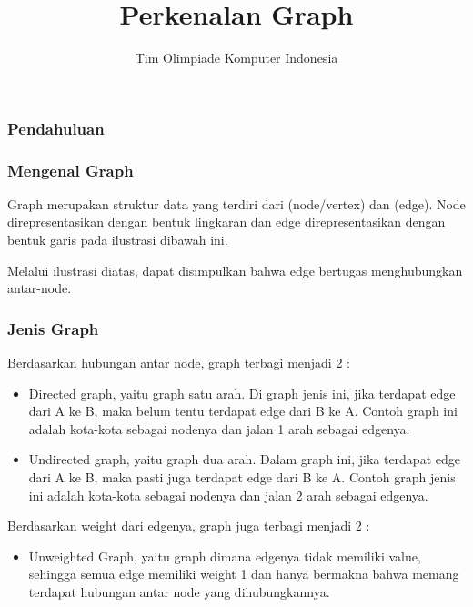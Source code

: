 

\title{Perkenalan Graph}
\author{Tim Olimpiade Komputer Indonesia}
\date{}



\begin{frame}
\titlepage
\end{frame}

\begin{frame}
\frametitle{Pendahuluan}

\end{frame}

\begin{frame}
\frametitle{Mengenal Graph}
Graph merupakan struktur data yang terdiri dari \alert(node/vertex) dan \alert(edge). Node direpresentasikan dengan bentuk lingkaran dan edge direpresentasikan dengan bentuk garis pada ilustrasi dibawah ini.
\end{frame}

\begin{frame}
Melalui ilustrasi diatas, dapat disimpulkan bahwa edge bertugas menghubungkan antar-node. 
\end{frame}

\begin{frame}
\frametitle{Jenis Graph}
Berdasarkan hubungan antar node, graph terbagi menjadi 2 :
\begin{itemize}
	\item Directed graph, yaitu graph satu arah. Di graph jenis ini, jika terdapat edge dari A ke B, maka belum tentu terdapat edge dari B ke A. Contoh graph ini adalah kota-kota sebagai nodenya dan jalan 1 arah sebagai edgenya.
	\item Undirected graph, yaitu graph dua arah. Dalam graph ini, jika terdapat edge dari A ke B, maka pasti juga terdapat edge dari B ke A. Contoh graph jenis ini adalah kota-kota sebagai nodenya dan jalan 2 arah sebagai edgenya.
\end{itemize}
Berdasarkan weight dari edgenya, graph juga terbagi menjadi 2 :
\begin{itemize}
	\item Unweighted Graph, yaitu graph dimana edgenya tidak memiliki value, sehingga semua edge memiliki weight 1 dan hanya bermakna bahwa memang terdapat hubungan antar node yang dihubungkannya. 
\end{itemize}
\end{frame}

